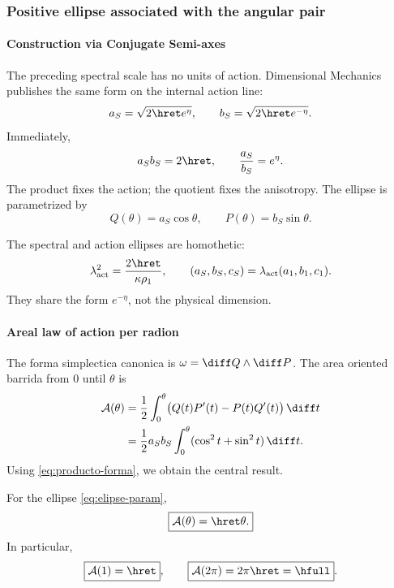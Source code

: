 \subsubsection{Positive ellipse associated with the angular pair}

\paragraph{Construction via Conjugate Semi-axes}

The preceding spectral scale has no units of action. Dimensional
Mechanics publishes the same form on the internal action line:
\begin{equation}
a_S=\sqrt{2\hret e^\eta},
\qquad
b_S=\sqrt{2\hret e^{-\eta}}.
\label{eq:semiejes-accion}
\end{equation}
Immediately,
\begin{equation}
a_Sb_S=2\hret,\qquad
\frac{a_S}{b_S}=e^\eta.
\label{eq:producto-forma}
\end{equation}
The product fixes the action; the quotient fixes the anisotropy. The ellipse is
parametrized by
\begin{equation}
Q(\theta)=a_S\cos\theta,\qquad
P(\theta)=b_S\sin\theta.
\label{eq:elipse-param}
\end{equation}

The spectral and action ellipses are homothetic:
\begin{equation}
\lambda_{\mathrm{act}}^2=\frac{2\hret}{\kappa\rho_1},
\qquad
(a_S,b_S,c_S)=\lambda_{\mathrm{act}}(a_1,b_1,c_1).
\label{eq:homotecia}
\end{equation}
They share the form \(e^{-\eta}\), not the physical dimension.

\paragraph{Areal law of action per radion}

The forma simplectica canonica is \(\omega=\diff Q\wedge\diff P\). The area
oriented barrida from \(0\) until \(\theta\) is
\begin{align}
\mathcal A(\theta)
&=\frac12\int_0^\theta
\bigl(Q(t)P'(t)-P(t)Q'(t)\bigr)\,\diff t\\
&=\frac12a_Sb_S\int_0^\theta
(\cos^2t+\sin^2t)\,\diff t.
\end{align}
Using \eqref{eq:producto-forma}, we obtain the central result.

\begin{theorem}
For the ellipse \eqref{eq:elipse-param},
\begin{equation}
\boxed{\mathcal A(\theta)=\hret\theta.}
\label{eq:area-theorem}
\end{equation}
In particular,
\begin{equation}
\boxed{\mathcal A(1)=\hret},
\qquad
\boxed{\mathcal A(2\pi)=2\pi\hret=\hfull}.
\label{eq:area-radion-vuelta}
\end{equation}
\end{theorem}

